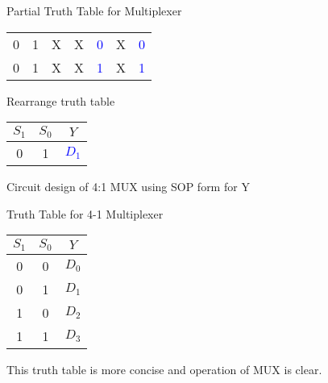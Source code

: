 \begin{frame}{Partial Truth Table for Multiplexer}
\begin{multicols}{2}
\begin{center}
\begin{tabular}{cc|cccc|c}
   0 & 1 & X & X & \textcolor{blue}{0} &  X & \textcolor{blue}{0} \\
   0 & 1 & X & X & \textcolor{blue}{1} & X & \textcolor{blue}{1} \\
    \hline
		\end{tabular}
		\end{center}

  
Rearrange truth table
\begin{center}
\small
		\begin{tabular}{cc|c}
		 $S_1$ & $S_0$ & $Y$\\\hline
\hline		
   0 & 1 & \textcolor{blue}{$D_1$} \\
    \hline
		\end{tabular}
		\end{center}

  \end{multicols}
\end{frame}



\begin{frame}{Circuit design of 4:1 MUX using SOP form for Y}
\begin{multicols}{2}
\columnbreak

 Truth Table for 4-1 Multiplexer
		\begin{center}
		\begin{tabular}{cc|c}
		$S_1$ & $S_0$ & $Y$\\\hline
		0 & 0 & $D_0$\\
		0 & 1 & $D_1$\\
		1 & 0 & $D_2$\\
		1 & 1 & $D_3$\\
		\end{tabular}
		\end{center}
  This truth table is more concise and operation of MUX is clear. 
\end{multicols}  

\BNotes\ifnum{}
~
\fi\ENotes
\end{frame}

